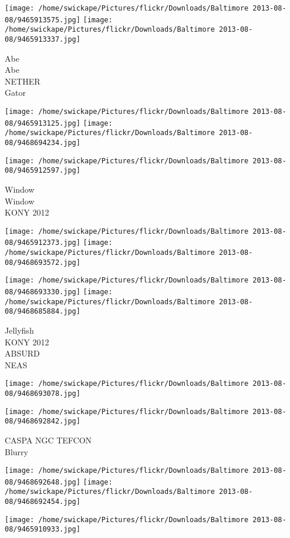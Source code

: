 \documentclass[10pt,letterpaper]{article}
\begin{document}
\texttt{[image: /home/swickape/Pictures/flickr/Downloads/Baltimore 2013-08-08/9465913575.jpg]}
\texttt{[image: /home/swickape/Pictures/flickr/Downloads/Baltimore 2013-08-08/9465913337.jpg]}

Abe\\
Abe\\
NETHER\\
Gator
\pagebreak

\texttt{[image: /home/swickape/Pictures/flickr/Downloads/Baltimore 2013-08-08/9465913125.jpg]}
\texttt{[image: /home/swickape/Pictures/flickr/Downloads/Baltimore 2013-08-08/9468694234.jpg]}

\vspace{0.25in}
\texttt{[image: /home/swickape/Pictures/flickr/Downloads/Baltimore 2013-08-08/9465912597.jpg]}

Window\\
Window\\
KONY 2012
\pagebreak

\texttt{[image: /home/swickape/Pictures/flickr/Downloads/Baltimore 2013-08-08/9465912373.jpg]}
\texttt{[image: /home/swickape/Pictures/flickr/Downloads/Baltimore 2013-08-08/9468693572.jpg]}

\texttt{[image: /home/swickape/Pictures/flickr/Downloads/Baltimore 2013-08-08/9468693330.jpg]}
\texttt{[image: /home/swickape/Pictures/flickr/Downloads/Baltimore 2013-08-08/9468685884.jpg]}

Jellyfish\\
KONY 2012\\
ABSURD\\
NEAS
\pagebreak

\texttt{[image: /home/swickape/Pictures/flickr/Downloads/Baltimore 2013-08-08/9468693078.jpg]}

\vspace{0.25in}
\texttt{[image: /home/swickape/Pictures/flickr/Downloads/Baltimore 2013-08-08/9468692842.jpg]}

CASPA NGC TEFCON\\
Blurry
\pagebreak

\texttt{[image: /home/swickape/Pictures/flickr/Downloads/Baltimore 2013-08-08/9468692648.jpg]}
\texttt{[image: /home/swickape/Pictures/flickr/Downloads/Baltimore 2013-08-08/9468692454.jpg]}

\vspace{0.25in}
\texttt{[image: /home/swickape/Pictures/flickr/Downloads/Baltimore 2013-08-08/9465910933.jpg]}
\end{document}
